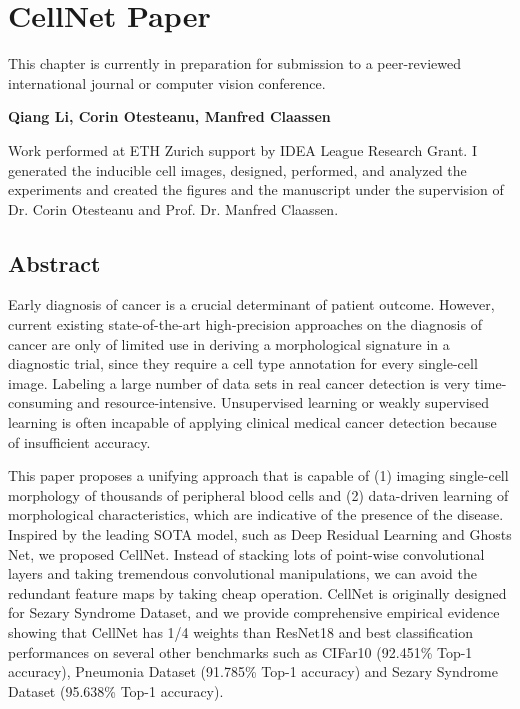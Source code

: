 \section{CellNet Paper}
\label{sec:lorem}

This chapter is currently in preparation for submission to a peer-reviewed international journal or computer vision conference.

\textbf{Qiang Li, Corin Otesteanu, Manfred Claassen}

Work performed at ETH Zurich support by IDEA League Research Grant.
I generated the inducible cell images, designed, performed, and analyzed the experiments and created the figures and the manuscript under the supervision of Dr. Corin Otesteanu and Prof. Dr. Manfred Claassen.

\subsection{Abstract}
\label{sec:abstract}
Early diagnosis of cancer is a crucial determinant of patient outcome. However, current existing state-of-the-art high-precision approaches on the diagnosis of cancer are only of limited use in deriving a morphological signature in a diagnostic trial, since they require a cell type annotation for every single-cell image. Labeling a large number of data sets in real cancer detection is very time-consuming and resource-intensive. Unsupervised learning or weakly supervised learning is often incapable of applying clinical medical cancer detection because of insufficient accuracy.

This paper proposes a unifying approach that is capable of (1) imaging single-cell morphology of thousands of peripheral blood cells and (2) data-driven learning of morphological characteristics, which are indicative of the presence of the disease.
Inspired by the leading SOTA model, such as Deep Residual Learning\cite{20} and Ghosts Net\cite{19}, we proposed CellNet. Instead of stacking lots of point-wise convolutional layers and taking tremendous convolutional manipulations, we can avoid the redundant feature maps by taking cheap operation. CellNet is originally designed for Sezary Syndrome Dataset, and we provide comprehensive empirical evidence showing that CellNet has 1/4 weights than ResNet18 \cite{20} and best classification performances on several other benchmarks such as CIFar10 \cite{21} (92.451\% Top-1 accuracy), Pneumonia Dataset\cite{38} (91.785\% Top-1 accuracy) and Sezary Syndrome Dataset (95.638\% Top-1 accuracy).

